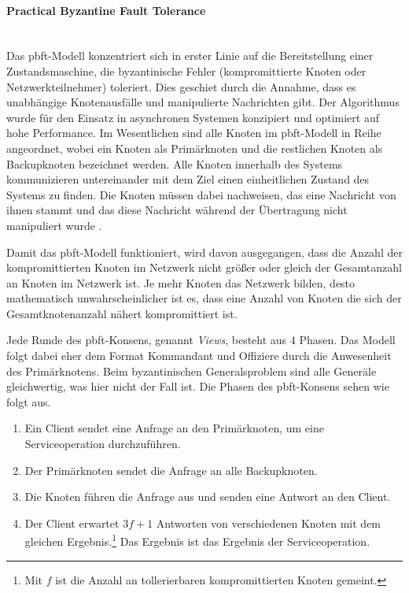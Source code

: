 \paragraph{Practical Byzantine Fault Tolerance}$~~$\\
Das \ac{pbft}-Modell konzentriert sich in erster Linie auf die Bereitstellung einer Zustandsmaschine, die byzantinische Fehler (kompromittierte Knoten oder Netzwerkteilnehmer) toleriert. Dies geschiet durch die Annahme, dass es unabhängige Knotenausfälle und manipulierte Nachrichten gibt. Der Algorithmus wurde für den Einsatz in asynchronen Systemen konzipiert und optimiert auf hohe Performance. Im Wesentlichen sind alle Knoten im \ac{pbft}-Modell in Reihe angeordnet, wobei ein Knoten als Primärknoten und die restlichen Knoten als Backupknoten bezeichnet werden. Alle Knoten innerhalb des Systems kommunizieren untereinander mit dem Ziel einen einheitlichen Zustand des Systems zu finden. Die Knoten müssen dabei nachweisen, das eine Nachricht von ihnen stammt und das diese Nachricht während der Übertragung nicht manipuliert wurde \citep{Tuan2017}.

Damit das \ac{pbft}-Modell funktioniert, wird davon ausgegangen, dass die Anzahl der kompromittierten Knoten im Netzwerk nicht größer oder gleich  der Gesamtanzahl an Knoten im Netzwerk ist. Je mehr Knoten das Netzwerk bilden, desto mathematisch unwahrscheinlicher ist es, dass eine Anzahl von Knoten die sich  der Gesamtknotenanzahl nähert kompromittiert ist.

Jede Runde des \ac{pbft}-Konsens, genannt \textit{Views}, besteht aus 4 Phasen. Das Modell folgt dabei eher dem Format \glqq Kommandant und Offiziere\grqq{} durch die Anwesenheit des Primärknotens. Beim byzantinischen Generalsproblem sind alle Generäle gleichwertig, was hier nicht der Fall ist. Die Phasen des \ac{pbft}-Konsens sehen wie folgt aus.

\begin{enumerate}
	\item Ein Client sendet eine Anfrage an den Primärknoten, um eine Serviceoperation durchzuführen.
	\item Der Primärknoten sendet die Anfrage an alle Backupknoten.
	\item Die Knoten führen die Anfrage aus und senden eine Antwort an den Client.
	\item Der Client erwartet \(3f + 1\) Antworten von verschiedenen Knoten mit dem gleichen Ergebnis.\footnote{Mit \(f\) ist die Anzahl an tollerierbaren kompromittierten Knoten gemeint.} Das Ergebnis ist das Ergebnis der Serviceoperation.
\end{enumerate}

